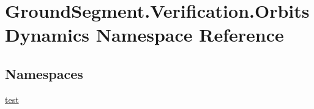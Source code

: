 \hypertarget{namespace_ground_segment_1_1_verification_1_1_orbits_dynamics}{}\section{Ground\+Segment.\+Verification.\+Orbits\+Dynamics Namespace Reference}
\label{namespace_ground_segment_1_1_verification_1_1_orbits_dynamics}
\subsection*{Namespaces}
\begin{DoxyCompactItemize}
\item 
 \hyperlink{namespace_ground_segment_1_1_verification_1_1_orbits_dynamics_1_1test}{test}
\end{DoxyCompactItemize}
